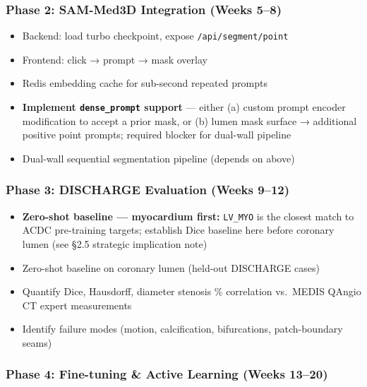 \documentclass[
  11pt,
]{article}
\providecommand{\tightlist}{%
  \setlength{\itemsep}{0pt}\setlength{\parskip}{0pt}}
\begin{document}
\subsubsection{Phase 2: SAM-Med3D Integration (Weeks
5--8)}\label{phase-2-sam-med3d-integration-weeks-58}

\begin{itemize}
\tightlist
\item[$\square$]
  Backend: load turbo checkpoint, expose \texttt{/api/segment/point}
\item[$\square$]
  Frontend: click → prompt → mask overlay
\item[$\square$]
  Redis embedding cache for sub-second repeated prompts
\item[$\square$]
  \textbf{Implement \texttt{dense\_prompt} support} --- either (a)
  custom prompt encoder modification to accept a prior mask, or (b)
  lumen mask surface → additional positive point prompts; required
  blocker for dual-wall pipeline
\item[$\square$]
  Dual-wall sequential segmentation pipeline (depends on above)
\end{itemize}

\subsubsection{Phase 3: DISCHARGE Evaluation (Weeks
9--12)}\label{phase-3-discharge-evaluation-weeks-912}

\begin{itemize}
\tightlist
\item[$\square$]
  \textbf{Zero-shot baseline --- myocardium first:} \texttt{LV\_MYO} is
  the closest match to ACDC pre-training targets; establish Dice
  baseline here before coronary lumen (see §2.5 strategic implication
  note)
\item[$\square$]
  Zero-shot baseline on coronary lumen (held-out DISCHARGE cases)
\item[$\square$]
  Quantify Dice, Hausdorff, diameter stenosis \% correlation vs.~MEDIS
  QAngio CT expert measurements
\item[$\square$]
  Identify failure modes (motion, calcification, bifurcations,
  patch-boundary seams)
\end{itemize}

\subsubsection{Phase 4: Fine-tuning \& Active Learning (Weeks
13--20)}\label{phase-4-fine-tuning-active-learning-weeks-1320}
\end{document}
